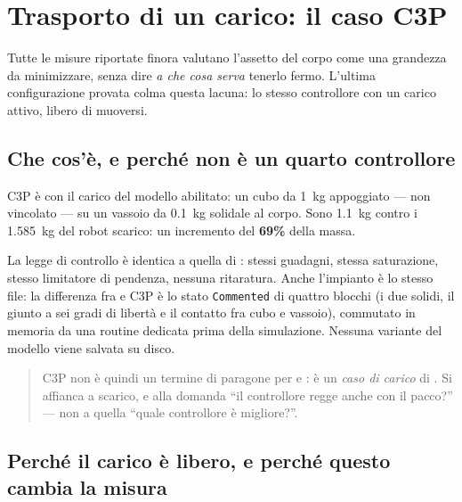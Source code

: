 
\providecommand{\Cthp}{\textsf{C3P}}

\section{Trasporto di un carico: il caso \Cthp}
\label{sec:c3p}

Tutte le misure riportate finora valutano l'assetto del corpo come una
grandezza da minimizzare, senza dire \emph{a che cosa serva} tenerlo fermo.
L'ultima configurazione provata colma questa lacuna: lo stesso controllore
\Cth{} con un carico attivo, libero di muoversi.

\subsection{Che cos'è, e perché non è un quarto controllore}

\Cthp{} è \Cth{} con il carico del modello abilitato: un cubo da
\SI{1}{\kilogram} appoggiato — non vincolato — su un vassoio da
\SI{0.1}{\kilogram} solidale al corpo. Sono \SI{1.1}{\kilogram} contro i
\SI{1.585}{\kilogram} del robot scarico: un incremento del \textbf{69\%} della
massa.

La legge di controllo è identica a quella di \Cth{}: stessi guadagni, stessa
saturazione, stesso limitatore di pendenza, nessuna ritaratura. Anche
l'impianto è lo stesso file: la differenza fra \Cth{} e \Cthp{} è lo stato
\texttt{Commented} di quattro blocchi (i due solidi, il giunto a sei gradi di
libertà e il contatto fra cubo e vassoio), commutato in memoria da una
routine dedicata prima della simulazione. Nessuna variante del modello viene
salvata su disco.

\begin{quote}
\Cthp{} non è quindi un termine di paragone per \Co{} e \Ct{}: è un
\emph{caso di carico} di \Cth{}. Si affianca a \Cth{} scarico, e alla domanda
``il controllore regge anche con il pacco?'' --- non a quella ``quale
controllore è migliore?''.
\end{quote}

\subsection{Perché il carico è libero, e perché questo cambia la misura}

